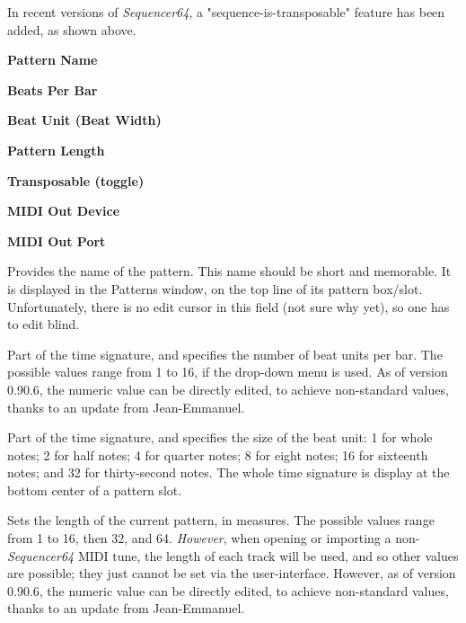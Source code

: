    In recent versions of \textsl{Sequencer64}, a "sequence-is-transposable"
   feature has been added, as shown above.


   \begin{enumber}
      \item \textbf{Pattern Name}
      \item \textbf{Beats Per Bar}
      \item \textbf{Beat Unit (Beat Width)}
      \item \textbf{Pattern Length}
      \item \textbf{Transposable (toggle)}
      \item \textbf{MIDI Out Device}
      \item \textbf{MIDI Out Port}
   \end{enumber}

   \setcounter{ItemCounter}{0}      %

   Provides the name of the pattern.
   This name should be short and memorable.
   It is displayed in the Patterns window, on the top line of its pattern
   box/slot.
   Unfortunately, there is no edit cursor in this field (not sure why yet), so
   one has to edit blind.

   Part of the time signature, and specifies the number of beat units per bar.
   The possible values range from 1 to 16, if the drop-down menu is used.
   As of version 0.90.6, the numeric value can be directly edited, to achieve
   non-standard values, thanks to an update from Jean-Emmanuel.

   Part of the time signature, and specifies the size of the beat unit:
   1 for whole notes; 2 for half notes; 4 for quarter notes; 8 for eight notes;
   16 for sixteenth notes; and 32 for thirty-second notes.
   The whole time signature is display at the bottom center of a pattern
   slot.

   Sets the length of the current pattern, in measures.
   The possible values range from 1 to 16, then 32, and 64.
   \textsl{However}, when opening or importing a non-\textsl{Sequencer64}
   MIDI tune, the length of each track will be used, and so other values
   are possible; they just cannot be set via the user-interface.
   However, as of version 0.90.6, the numeric value can be directly edited, to
   achieve non-standard values, thanks to an update from Jean-Emmanuel.

